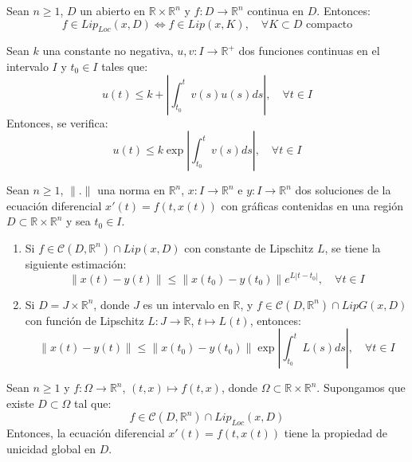\begin{theorem}
    Sean $n \geq 1$, $D$ un abierto en $\mathbb{R} \times \mathbb{R}^n$ y $f: D \to \mathbb{R}^n$ continua en $D$.
    Entonces:
    $$f \in Lip_{Loc}(x, D) \Leftrightarrow f \in Lip(x, K), \quad \forall K \subset D \text{ compacto}$$
\end{theorem}

\begin{proposition}
    Sean $k$ una constante no negativa, $u, v: I \to \mathbb{R}^+$ dos funciones continuas en el intervalo $I$ y $t_0 \in I$ tales que:
    $$u(t) \leq k + \left| \int_{t_0}^t v(s)u(s)ds \right|, \quad \forall t \in I$$
    Entonces, se verifica:
    $$u(t) \leq k\exp\left| \int_{t_0}^t v(s)ds \right|, \quad \forall t \in I$$
\end{proposition}

\begin{theorem}
    Sean $n \geq 1$, $\|.\|$ una norma en $\mathbb{R}^n$, $x: I \to \mathbb{R}^n$ e $y: I \to \mathbb{R}^n$ dos soluciones de la ecuación diferencial $x'(t) = f(t, x(t))$ con gráficas contenidas en una región $D \subset \mathbb{R} \times \mathbb{R}^n$ y sea $t_0 \in I$.
    \begin{enumerate}
        \item Si $f \in \mathcal{C}(D, \mathbb{R}^n) \cap Lip(x, D)$ con constante de Lipschitz $L$, se tiene la siguiente estimación:
              $$\|x(t) - y(t)\| \leq \|x(t_0) - y(t_0)\| e^{L|t-t_0|}, \quad \forall t \in I$$
        \item Si $D = J \times \mathbb{R}^n$, donde $J$ es un intervalo en $\mathbb{R}$, y $f \in \mathcal{C}(D, \mathbb{R}^n) \cap LipG(x, D)$ con función de Lipschitz $L: J \to \mathbb{R}$, $t \mapsto L(t)$, entonces:
              $$\|x(t) - y(t)\| \leq \|x(t_0) - y(t_0)\| \exp\left| \int_{t_0}^t L(s)ds \right|, \quad \forall t \in I$$
    \end{enumerate}
\end{theorem}

\begin{theorem}
    Sean $n \geq 1$ y $f: \Omega \to \mathbb{R}^n$, $(t, x) \mapsto f(t, x)$, donde $\Omega \subset \mathbb{R} \times \mathbb{R}^n$.
    Supongamos que existe $D \subset \Omega$ tal que:
    $$f \in \mathcal{C}(D, \mathbb{R}^n) \cap Lip_{Loc}(x, D)$$
    Entonces, la ecuación diferencial $x'(t) = f(t, x(t))$ tiene la propiedad de unicidad global en $D$.
\end{theorem}

